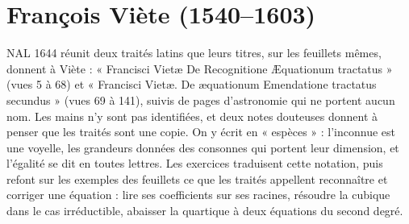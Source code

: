 \documentclass[11pt,a4paper]{article}
\begin{document}
\section*{François Viète (1540--1603)}

NAL 1644 réunit deux traités latins que leurs titres, sur les feuillets mêmes,
donnent à Viète : « Francisci Vietæ De Recognitione Æquationum tractatus »
(vues 5 à 68) et « Francisci Vietæ. De æquationum Emendatione tractatus
secundus » (vues 69 à 141), suivis de pages d'astronomie qui ne portent aucun
nom. Les mains n'y sont pas identifiées, et deux notes douteuses donnent à
penser que les traités sont une copie. On y écrit en « espèces » : l'inconnue
est une voyelle, les grandeurs données des consonnes qui portent leur
dimension, et l'égalité se dit en toutes lettres. Les exercices traduisent
cette notation, puis refont sur les exemples des feuillets ce que les traités
appellent reconnaître et corriger une équation : lire ses coefficients sur ses
racines, résoudre la cubique dans le cas irréductible, abaisser la quartique à
deux équations du second degré.
\end{document}
